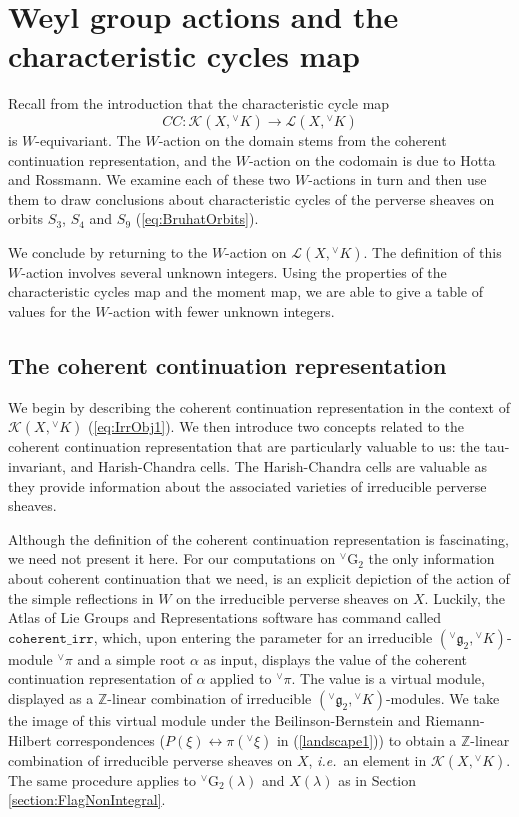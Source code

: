 \documentclass[a4paper, 11pt]{article}
\begin{document}
\section{Weyl group actions and the  characteristic cycles map}
\label{cohcont}

Recall from the introduction that the characteristic cycle map
$$CC: \mathscr{K}(X, {^\vee}K) \rightarrow \mathscr{L}(X,
{^\vee}K)$$
is $W$-equivariant.  The $W$-action on the domain stems from the
coherent continuation representation, and the $W$-action on the
codomain is due to Hotta and Rossmann.  We examine each of these two
$W$-actions in turn and then use them to draw conclusions about
characteristic cycles of the perverse sheaves on orbits $S_{3}$,
$S_{4}$ and $S_{9}$ (\ref{eq:BruhatOrbits}).  

We conclude by
returning to the $W$-action on  $\mathscr{L}(X,{^\vee}K)$.  The
definition of this $W$-action 
involves  several unknown integers.   Using the
properties of the characteristic cycles map and the moment map,
we are able to give a table of values for the $W$-action with fewer
unknown integers. 

\subsection{The coherent continuation representation}

We begin by describing the coherent continuation representation in the
context of $\mathscr{K}(X, {^\vee}K)$ (\ref{eq:IrrObj1}).  We then introduce
two concepts related to the coherent continuation representation that are
particularly valuable to us:  the tau-invariant, and Harish-Chandra
cells.  The Harish-Chandra cells are valuable as they provide information
about the associated varieties of irreducible perverse sheaves.

Although the definition of the coherent continuation representation is
fascinating, we need not present it here.   
For our computations on ${}^{\vee}\mathrm{G}_{2}$
the only information about coherent continuation that we 
need, is an explicit 
depiction of the action of the simple reflections in $W$ 
on the irreducible perverse sheaves on $X$. 
Luckily, the Atlas of Lie Groups and Representations software has
command called  
$\mathtt{coherent{\_}irr}$, which, upon entering the parameter for an
irreducible  $({^\vee}\mathfrak{g}_{2},{^\vee}K)$-module
${}^{\vee}\pi$ and a simple root $\alpha$ as input, 
displays the  value of the coherent continuation representation of
$\alpha$ applied to ${^\vee}\pi$.  The value is a virtual
module, displayed  as a $\mathbb{Z}$-linear combination of irreducible 
$({^\vee}\mathfrak{g}_{2}, {^\vee}K)$-modules. We take the image of
this virtual module under the Beilinson-Bernstein and Riemann-Hilbert
correspondences ($P(\xi) \leftrightarrow \pi({^\vee}\xi)$ in
(\ref{landscape1})) to obtain a $\mathbb{Z}$-linear 
combination of irreducible perverse sheaves on $X$, \emph{i.e.}~an
element in $\mathscr{K}(X, {^\vee}K)$.    The same procedure applies
to ${^\vee}\mathrm{G}_{2}(\lambda)$ and $X(\lambda)$ as in Section
\ref{section:FlagNonIntegral}.  
\end{document}
